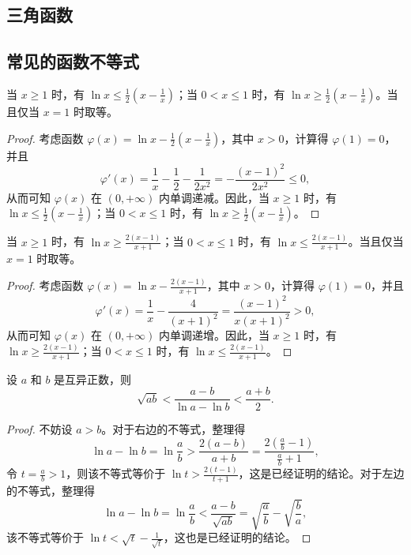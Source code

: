 \clearpage
\subsection{三角函数}
\clearpage
\subsection{常见的函数不等式}
\begin{theorem}
    当 $x \geqslant 1$ 时，有 $\ln x \leqslant \frac{1}{2}\left(x - \frac{1}{x}\right)$；当 $0 < x \leqslant 1$ 时，有 $\ln x \geqslant \frac{1}{2}\left(x - \frac{1}{x}\right)$。当且仅当 $x = 1$ 时取等。
\end{theorem}
\begin{proof}
    考虑函数 $\varphi(x) = \ln x - \frac{1}{2}\left(x - \frac{1}{x}\right)$，其中 $x > 0$，计算得 $\varphi(1) = 0$，并且
\[
\varphi'(x) = \frac{1}{x} - \frac{1}{2} - \frac{1}{2x^2} = -\frac{(x-1)^2}{2x^2} \leqslant 0,
\]
从而可知 $\varphi(x)$ 在 $(0, +\infty)$ 内单调递减。因此，当 $x \geqslant 1$ 时，有 $\ln x \leqslant \frac{1}{2}\left(x - \frac{1}{x}\right)$；当 $0 < x \leqslant 1$ 时，有 $\ln x \geqslant \frac{1}{2}\left(x - \frac{1}{x}\right)$。
\end{proof}
\begin{theorem}
    当 $x \geqslant 1$ 时，有 $\ln x \geqslant \frac{2(x-1)}{x+1}$；当 $0 < x \leqslant 1$ 时，有 $\ln x \leqslant \frac{2(x-1)}{x+1}$。当且仅当 $x = 1$ 时取等。
\end{theorem}

\begin{proof}
    考虑函数 $\varphi(x) = \ln x - \frac{2(x-1)}{x+1}$，其中 $x > 0$，计算得 $\varphi(1) = 0$，并且
\[
\varphi'(x) = \frac{1}{x} - \frac{4}{(x+1)^2} = \frac{(x-1)^2}{x(x+1)^2} > 0,
\]
从而可知 $\varphi(x)$ 在 $(0, +\infty)$ 内单调递增。因此，当 $x \geqslant 1$ 时，有 $\ln x \geqslant \frac{2(x-1)}{x+1}$；当 $0 < x \leqslant 1$ 时，有 $\ln x \leqslant \frac{2(x-1)}{x+1}$。
\end{proof}

\begin{theorem}[对数均值不等式]
    设 $a$ 和 $b$ 是互异正数，则
\[
\sqrt{ab} < \frac{a-b}{\ln a - \ln b} < \frac{a+b}{2}.
\]
\end{theorem}
\begin{proof}
    不妨设 $a > b$。对于右边的不等式，整理得
\[
\ln a - \ln b = \ln \frac{a}{b} > \frac{2(a-b)}{a+b} = \frac{2\left(\frac{a}{b} - 1\right)}{\frac{a}{b} + 1},
\]
令 $t = \frac{a}{b} > 1$，则该不等式等价于 $\ln t > \frac{2(t-1)}{t+1}$，这是已经证明的结论。对于左边的不等式，整理得
\[
\ln a - \ln b = \ln \frac{a}{b} < \frac{a-b}{\sqrt{ab}} = \sqrt{\frac{a}{b}} - \sqrt{\frac{b}{a}},
\]
该不等式等价于 $\ln t < \sqrt{t} - \frac{1}{\sqrt{t}}$，这也是已经证明的结论。
\end{proof}

